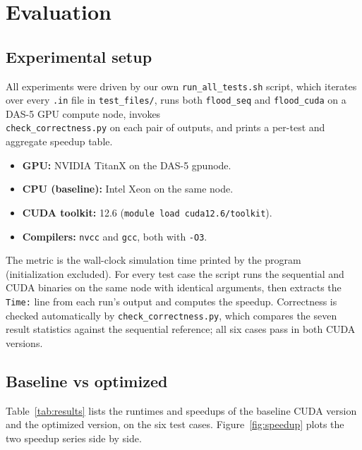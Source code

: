 \documentclass[sigconf, nonacm, review]{acmart}
\begin{document}
\section{Evaluation}\label{sec:eval}

\subsection{Experimental setup}
All experiments were driven by our own
\texttt{run\_all\_tests.sh} script, which iterates over every
\texttt{.in} file in \texttt{test\_files/}, runs both
\texttt{flood\_seq} and \texttt{flood\_cuda} on a DAS-5 GPU
compute node, invokes\\
\texttt{check\_correctness.py} on each
pair of outputs, and prints a per-test and aggregate speedup
table.

\begin{itemize}
  \item \textbf{GPU:} NVIDIA TitanX on the DAS-5 gpunode.
  \item \textbf{CPU (baseline):} Intel Xeon on the same node.
  \item \textbf{CUDA toolkit:} 12.6
    (\texttt{module load cuda12.6/toolkit}).
  \item \textbf{Compilers:} \texttt{nvcc} and \texttt{gcc}, both
    with \texttt{-O3}.
\end{itemize}

The metric is the wall-clock simulation time printed by the
program (initialization excluded). For every test case the
script runs the sequential and CUDA binaries on the same node
with identical arguments, then extracts the \texttt{Time:} line
from each run's output and computes the speedup. Correctness is
checked automatically by \texttt{check\_correctness.py}, which
compares the seven result statistics against the sequential
reference; all six cases pass in both CUDA versions.

\subsection{Baseline vs optimized}
Table~\ref{tab:results} lists the runtimes and speedups of the
baseline CUDA version and the optimized version, on the six test
cases.  Figure~\ref{fig:speedup} plots the two speedup series
side by side.
\end{document}

